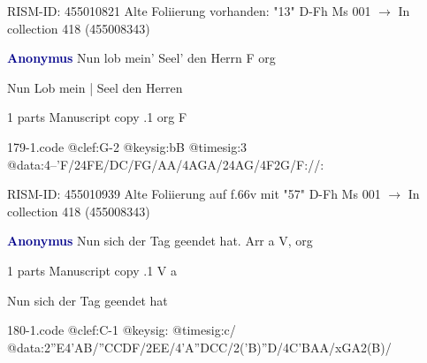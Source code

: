 \documentclass[twocolumn]{book}
\begin{document}
\newline RISM-ID: 455010821
\newline Alte Foliierung vorhanden: "13"
\newline D-Fh  Ms 001
\newline $\rightarrow$ In collection 418 (455008343)

\newline \par \vspace{7pt} \textcolor{darkblue}{\textbf{Anonymus  }}
\newline Nun lob mein' Seel' den Herrn  F  
\newline org
\newline \begin{itshape}[f.66v, at left:] Nun Lob mein | Seel den Herren\end{itshape} 
\newline \textcolor{darkblue}{}  1 parts  
\newline Manuscript copy
.1  org  F  
\begin{filecontents*}{179-1.code}
@clef:G-2
@keysig:bB
@timesig:3
@data:4--'F/24FE/DC/FG/AA/4AGA/24AG/4F2G/F://:
\end{filecontents*}
\newline
%

\newline RISM-ID: 455010939
\newline Alte Foliierung auf f.66v mit "57"
\newline D-Fh  Ms 001
\newline $\rightarrow$ In collection 418 (455008343)

\newline \par \vspace{7pt} \textcolor{darkblue}{\textbf{Anonymus  }}
\newline Nun sich der Tag geendet hat. Arr  a  
\newline V, org
\newline \begin{itshape}\end{itshape} 
\newline \textcolor{darkblue}{}  1 parts  
\newline Manuscript copy
.1  V  a
\newline \begin{footnotesize} Nun sich der Tag geendet hat \end{footnotesize}  
\begin{filecontents*}{180-1.code}
@clef:C-1
@keysig:
@timesig:c/
@data:2''E4'AB/''CCDF/2EE/4'A''DCC/2('B)''D/4C'BAA/xGA2(B)/
\end{filecontents*}
\newline
%
\end{document}
